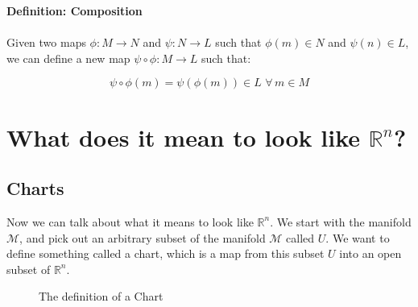 \documentclass[10pt]{article}
\begin{document}
\begin{tcolorbox}
\textbf{Definition: Composition} \\ \\ Given two maps $\phi : M \rightarrow N$ and $\psi : N \rightarrow L$ such that $\phi(m) \in N$ and $\psi(n) \in L$, we can define a new map $\psi\circ\phi : M \rightarrow L$ such that:

\begin{equation*}
    \psi\circ\phi (m) = \psi(\phi(m)) \in L \,\, \forall \, m \in M 
\end{equation*}

\end{tcolorbox}

\pagebreak

\section{What does it mean to look like $\mathbb{R}^n$?}
\subsection{Charts}
Now we can talk about what it means to look like $\mathbb{R}^n$. We start with the manifold $\mathcal{M}$, and pick out an arbitrary subset of the manifold $
\mathcal{M}$ called $U$. We want to define something called a chart, which is a map from this subset $U$ into an open  subset of $\mathbb{R}^n$. 

\begin{figure}[h!]
\centering

\caption{The definition of a Chart}
\label{fig:my_label 2}
\end{figure}
\end{document}
